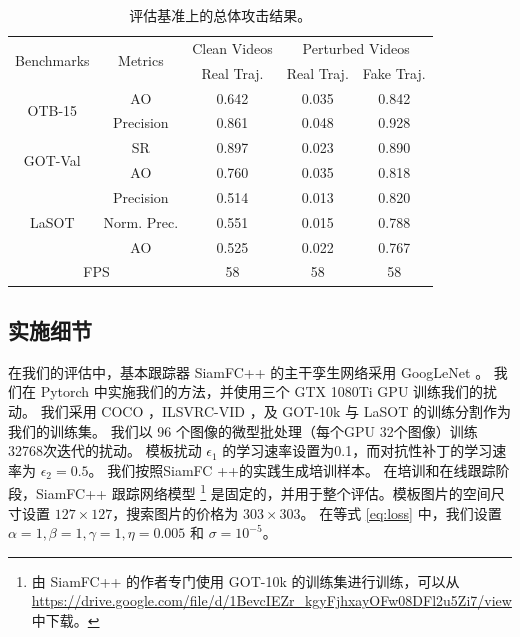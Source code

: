 \begin{table}
\centering
\begin{tabular}{c c | c | c | c}
\toprule
\multirow{2}{*}[-2pt]{Benchmarks} & \multirow{2}{*}[-2pt]{Metrics} & Clean Videos    & \multicolumn{2}{c}{Perturbed Videos}  \\
\cmidrule{3-5}
                          &                         & Real Traj. & Real Traj. & Fake Traj.     \\ 
\midrule
\multirow{2}{*}{OTB-15} 
& AO   & 0.642 & 0.035 & 0.842\\
& Precision & 0.861 & 0.048 & 0.928\\
\midrule
\multirow{2}{*}{GOT-Val} 
& SR & 0.897 & 0.023 & 0.890\\
& AO 				   & 0.760 & 0.035 & 0.818 \\
\midrule
\multirow{3}{*}{LaSOT} 
& Precision       & 0.514 & 0.013 & 0.820\\
& Norm. Prec. & 0.551 & 0.015 & 0.788\\
& AO & 0.525 & 0.022 & 0.767\\
\midrule
\multicolumn{2}{c|}{FPS} & 58 & 58 & 58\\
\bottomrule
\end{tabular}
\caption{评估基准上的总体攻击结果。}
\label{tab:benchmark results}
\end{table}

\subsection{实施细节}

在我们的评估中，基本跟踪器 SiamFC++ \cite{SiamFC++} 的主干孪生网络采用 GoogLeNet \cite{GoogLeNet}。
我们在 Pytorch 中实施我们的方法，并使用三个 GTX 1080Ti GPU 训练我们的扰动。
我们采用 COCO \cite{COCO}，ILSVRC-VID \cite{VID}，及 GOT-10k \cite{GOT-10k} 与 LaSOT \cite{LaSOT} 的训练分割作为我们的训练集。
我们以 96 个图像的微型批处理（每个GPU 32个图像）训练32768次迭代的扰动。
模板扰动 $\epsilon_1$ 的学习速率设置为0.1，而对抗性补丁的学习速率为 $\epsilon_2 = 0.5$。
我们按照SiamFC ++的实践生成培训样本。
在培训和在线跟踪阶段，SiamFC++ 跟踪网络模型 \footnote{由 SiamFC++ 的作者专门使用 GOT-10k 的训练集进行训练，可以从 \url{https://drive.google.com/file/d/1BevcIEZr_kgyFjhxayOFw08DFl2u5Zi7/view} 中下载。} 是固定的，并用于整个评估。模板图片的空间尺寸设置 $127\times 127$，搜索图片的价格为 $303\times 303$。
在等式 \ref{eq:loss} 中，我们设置 $\alpha=1, \beta=1, \gamma=1, \eta=0.005$ 和 $\sigma=10^{-5}$。

